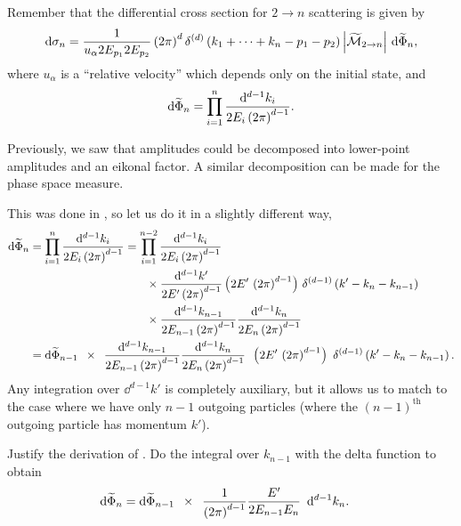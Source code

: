 Remember that the differential cross section for \(2 \to n\) scattering is given by
\begin{align}
    \dd \sigma_n
    =
    \frac{1}{u_\alpha 2 E_{p_1} 2 E_{p_2}} \left(2\pi\right)^d
    \delta^{(d)}\left(k_1 + \cdots + k_n - p_1 - p_2\right)
    \left|
        \widetilde{\mathcal{M}}_{2 \to n}
    \right|
    \,
    \dd\widetilde{\Phi}_n
    ,
\end{align}
where \(u_\alpha\) is a ``relative velocity'' which depends only on the initial state, and
\begin{align}
    \dd\widetilde\Phi_n
    =
    \prod_{i=1}^n
    \frac{\dd^{d-1}k_i}{2 E_i \left(2\pi\right)^{d-1}}
    .
\end{align}

Previously, we saw that amplitudes could be decomposed into lower-point amplitudes and an eikonal factor.
%
A similar decomposition can be made for the phase space measure.

This was done in , so let us do it in a slightly different way,
\begin{align}
    \dd \widetilde\Phi_n
    &=
    \prod_{i=1}^n
    \frac{\dd^{d-1}k_i}{2 E_i \le(2\pi\ri)^{d-1}}
    =
    \prod_{i=1}^{n-2}
    \frac{\dd^{d-1}k_i}{2 E_i \le(2\pi\ri)^{d-1}}
    \\
    &\qquad\qquad\qquad\qquad\qquad
    \notag
    \times
    \frac{\dd^{d-1}k'}{2 E' \le(2\pi\ri)^{d-1}}
    \le(2 E'\,\le(2\pi\ri)^{d-1}\ri)
    \,
    \delta^{(d-1)}\le(k' - k_n - k_{n-1}\ri)
    \\
    &\qquad\qquad\qquad\qquad\qquad
    \notag
    \times
    \frac{\dd^{d-1}k_{n-1}}{2 E_{n-1} \le(2\pi\ri)^{d-1}}
    \frac{\dd^{d-1}k_n}{2 E_n \le(2\pi\ri)^{d-1}}
    \\
    &=
    \dd\widetilde\Phi_{n-1}
    \,\,\,
    \times
    \,\,\,
    \frac{\dd^{d-1}k_{n-1}}{2 E_{n-1} \le(2\pi\ri)^{d-1}}
    \frac{\dd^{d-1}k_n}{2 E_n \le(2\pi\ri)^{d-1}}
    \,\,\,
    \le(2 E'\,\le(2\pi\ri)^{d-1}\ri)
    \,\,
    \delta^{(d-1)}\le(k' - k_n - k_{n-1}\ri)
    \label{eq:factor_phasespace}
    .
\end{align}
Any integration over \(\dd^{d-1} k'\) is completely auxiliary, but it allows us to match to the case where we have only \(n-1\) outgoing particles (where the \((n-1)^\text{th}\) outgoing particle has momentum \(k'\)).

\begin{exercise*}
    Justify the derivation of .
    Do the integral over \(k_{n-1}\) with the delta function to obtain
    \begin{align}
        \label{eq:phasespace_factorization_2}
        \dd \widetilde\Phi_n
        &=
        \dd\widetilde\Phi_{n-1}
        \,\,\,
        \times
        \,\,\,
        \frac{1}{\le(2\pi\ri)^{d-1}}
        \frac{E'}{2E_{n-1} E_n}
        \,\,\,
        \dd^{d-1}k_n
        .
    \end{align}
\end{exercise*}

